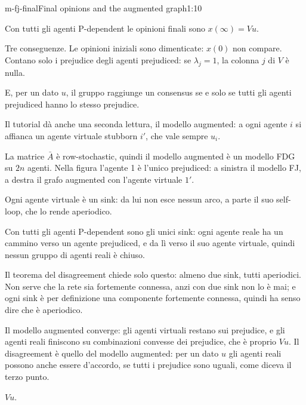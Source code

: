 \begin{slide}{m-fj-final}{Final opinions and the augmented graph}{1:10 {\color{red}}}
  \begin{discorso}
    \item Con tutti gli agenti P-dependent le opinioni finali sono $x(\infty)=Vu$.
    \item Tre conseguenze. Le opinioni iniziali sono dimenticate: $x(0)$ non compare. Contano solo i prejudice degli agenti prejudiced: se $\lambda_j=1$, la colonna $j$ di $V$ è nulla.
    \item E, per un dato $u$, il gruppo raggiunge un consensus se e solo se tutti gli agenti prejudiced hanno lo stesso prejudice.
    \item Il tutorial dà anche una seconda lettura, il modello augmented: a ogni agente $i$ si affianca un agente virtuale stubborn $i'$, che vale sempre $u_i$.
    \item La matrice $\bar A$ è row-stochastic, quindi il modello augmented è un modello FDG su $2n$ agenti. Nella figura l'agente 1 è l'unico prejudiced: a sinistra il modello FJ, a destra il grafo augmented con l'agente virtuale $1'$.
    \item {\color{blue}Ogni agente virtuale è un sink: da lui non esce nessun arco, a parte il suo self-loop, che lo rende aperiodico.}
    \item {\color{blue}Con tutti gli agenti P-dependent sono gli unici sink: ogni agente reale ha un cammino verso un agente prejudiced, e da lì verso il suo agente virtuale, quindi nessun gruppo di agenti reali è chiuso.}
    \item {\color{blue}Il teorema del disagreement chiede solo questo: almeno due sink, tutti aperiodici. Non serve che la rete sia fortemente connessa, anzi con due sink non lo è mai; e ogni sink è per definizione una componente fortemente connessa, quindi ha senso dire che è aperiodico.}
    \item {\color{blue}Il modello augmented converge: gli agenti virtuali restano sui prejudice, e gli agenti reali finiscono su combinazioni convesse dei prejudice, che è proprio $Vu$. Il disagreement è quello del modello augmented: per un dato $u$ gli agenti reali possono anche essere d'accordo, se tutti i prejudice sono uguali, come diceva il terzo punto.}
    \item {\color{red}                              } {\color{red}$Vu$.}

\end{discorso}
\end{slide}
